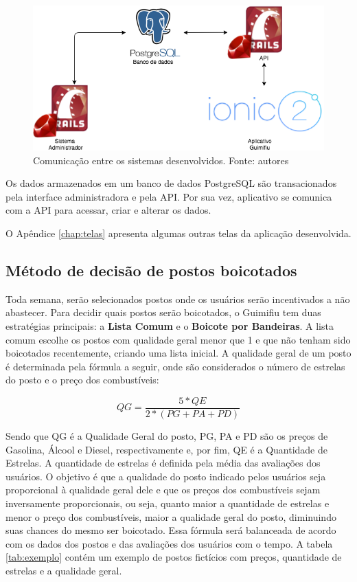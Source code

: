 \begin{figure}[H]
    \centering
    \includegraphics[scale=0.5]{figuras/comunicacao_sistemas.png}
    \caption[Comunicação entre os sistemas desenvolvidos.]{Comunicação entre os sistemas desenvolvidos. Fonte: autores}
    \label{img:comunicacaosistemas}
\end{figure}

Os dados armazenados em um banco de dados PostgreSQL são transacionados pela interface administradora e pela API. Por sua vez, aplicativo se comunica com a API para acessar, criar e alterar os dados.

O Apêndice \ref{chap:telas} apresenta algumas outras telas da aplicação desenvolvida.

\subsection{Método de decisão de postos boicotados}
Toda semana, serão selecionados postos onde os usuários serão incentivados a não abastecer. Para decidir quais postos serão boicotados, o Guimifiu tem duas estratégias principais: a \textbf{Lista Comum} e o \textbf{Boicote por Bandeiras}. A lista comum escolhe os postos com qualidade geral menor que 1 e que não tenham sido boicotados recentemente, criando uma lista inicial. A qualidade geral de um posto é determinada pela fórmula a seguir, onde são considerados o número de estrelas do posto e o preço dos combustíveis:

\begin{equation}
\label{Equação para cálculo de qualidade geral do Combustível}
	QG = \frac{5*QE}{2*(PG + PA + PD)}
\end{equation}

Sendo que QG é a Qualidade Geral do posto, PG, PA e PD são os preços de Gasolina, Álcool e Diesel, respectivamente e, por fim, QE é a Quantidade de Estrelas. A quantidade de estrelas é definida pela média das avaliações dos usuários. O objetivo é que a qualidade do posto indicado pelos usuários seja proporcional à qualidade geral dele e que os preços dos combustíveis sejam inversamente proporcionais, ou seja, quanto maior a quantidade de estrelas e menor o preço dos combustíveis, maior a qualidade geral do posto, diminuindo suas chances do mesmo ser boicotado. Essa fórmula será balanceada de acordo com os dados dos postos e das avaliações dos usuários com o tempo. A tabela \ref{tab:exemplo} contém um exemplo de postos fictícios com preços, quantidade de estrelas e a qualidade geral.

